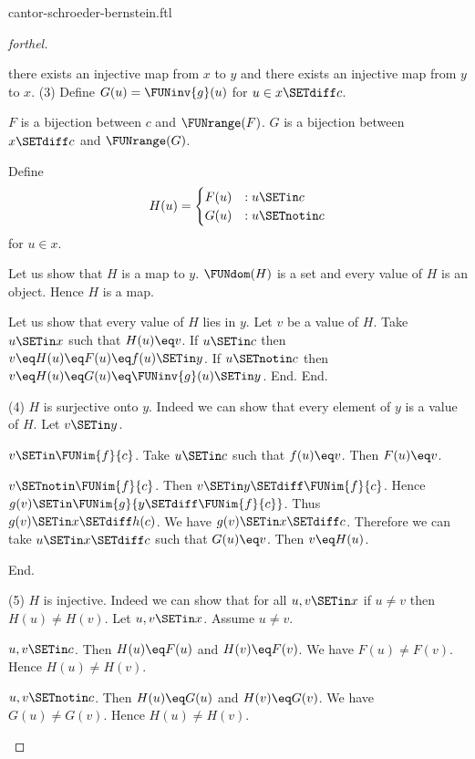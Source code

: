\documentclass{article}
\begin{document}
\begin{smodule}{cantor-schroeder-bernstein.ftl}
\begin{proof}[forthel]
\begin{case}{there exists an injective map from $x$ to $y$ and there exists an injective map from $y$ to $x$.}
    (3) Define $G(u) = \FUNinv{g}(u)$ for $u \in x \SETdiff c$.

    $F$ is a bijection between $c$ and $\FUNrange(F)$.
    $G$ is a bijection between $x \SETdiff c$ and $\FUNrange(G)$.

    Define \[ H(u) =
      \begin{cases}
        F(u) & : u \SETin c \\
        G(u) & : u \SETnotin c
      \end{cases} \]
    for $u \in x$.

    Let us show that $H$ is a map to $y$.
      $\FUNdom(H)$ is a set and every value of $H$ is an object.
      Hence $H$ is a map.

      Let us show that every value of $H$ lies in $y$.
        Let $v$ be a value of $H$.
        Take $u \SETin x$ such that $H(u) \eq v$.
        If $u \SETin c$ then $v \eq H(u) \eq F(u) \eq f(u) \SETin y$.
        If $u \SETnotin c$ then $v \eq H(u) \eq G(u) \eq \FUNinv{g}(u) \SETin y$.
      End.
    End.

    (4) $H$ is surjective onto $y$.
    Indeed we can show that every element of $y$ is a value of $H$.
      Let $v \SETin y$.

      \begin{case}{$v \SETin \FUNim{f}{c}$.}
        Take $u \SETin c$ such that $f(u) \eq v$.
        Then $F(u) \eq v$.
      \end{case}

      \begin{case}{$v \SETnotin \FUNim{f}{c}$.}
        Then $v \SETin y \SETdiff \FUNim{f}{c}$.
        Hence $g(v) \SETin \FUNim{g}{y \SETdiff \FUNim{f}{c}}$.
        Thus $g(v) \SETin x \SETdiff h(c)$.
        We have $g(v) \SETin x \SETdiff c$.
        Therefore we can take $u \SETin x \SETdiff c$ such that $G(u) \eq v$.
        Then $v \eq H(u)$.
      \end{case}
    End.

    (5) $H$ is injective.
    Indeed we can show that for all $u, v \SETin x$ if $u \neq v$ then $H(u) \neq H(v)$.
      Let $u,v \SETin x$.
      Assume $u \neq v$.

      \begin{case}{$u,v \SETin c$.}
        Then $H(u) \eq F(u)$ and $H(v) \eq F(v)$.
        We have $F(u) \neq F(v)$.
        Hence $H(u) \neq H(v)$.
      \end{case}

      \begin{case}{$u,v \SETnotin c$.}
        Then $H(u) \eq G(u)$ and $H(v) \eq G(v)$.
        We have $G(u) \neq G(v)$.
        Hence $H(u) \neq H(v)$.
      \end{case}


\end{case}
\end{proof}
\end{smodule}
\end{document}
